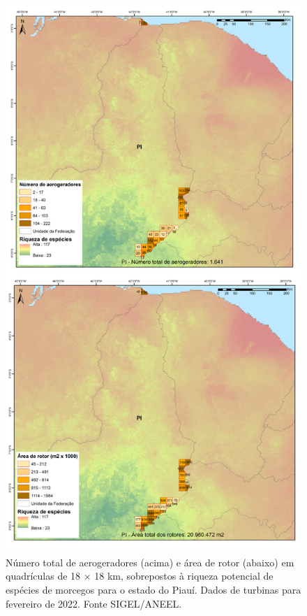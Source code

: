 \documentclass[
  oneside]{scrbook}
\begin{document}
\begin{figure}[H]

{\centering \includegraphics[width=0.75\linewidth]{imagens/cap09/Figura_9.6} 

}

\caption{Número total de aerogeradores (acima) e área de rotor (abaixo) em quadrículas de 18 × 18 km, sobrepostos à riqueza potencial de espécies de morcegos para o estado do Piauí. Dados de turbinas para fevereiro de 2022. Fonte SIGEL/ANEEL.}\label{fig:71}
\end{figure}
\end{document}
